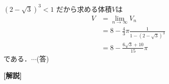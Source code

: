 \documentclass[a4paper,10pt]{ltjsarticle}
\begin{document}
\begin{multicols}{2}
$(2-\sqrt{3})^3 < 1$ だから求める体積$V$は
\begin{align*}
    V &= \lim_{n \to \infty} V_n \\
    &= 8 - \frac{4}{3}\pi \frac{1}{1-(2-\sqrt{3})^3} \\
    &= 8 - \frac{6\sqrt{3}+10}{15}\pi 
\end{align*}
である．$\cdots$(答)

{\bf[解説]}

     \newpage
\end{multicols}
\end{document}

